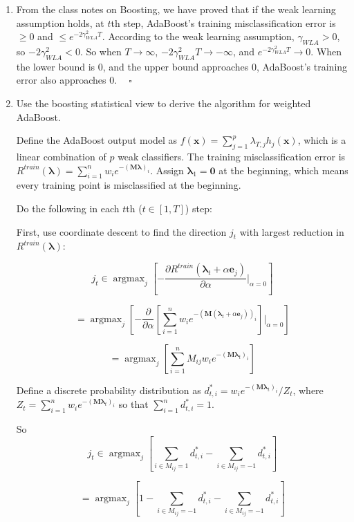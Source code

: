 \documentclass[paper=letter, fontsize=12pt]{article}
\DeclareMathOperator*{\argmax}{argmax}
\begin{document}
\begin{enumerate}[label=(\alph*)]
	
	\item From the class notes on Boosting, we have proved that if the weak learning assumption holds, at $t$th step, AdaBoost's training misclassification error is $\geq 0$ and $ \leq e^{-2 \gamma^2_{WLA}T}$. According to the weak learning assumption, $\gamma_{WLA} > 0$, so $-2 \gamma^2_{WLA} < 0$. So when $T \rightarrow \infty$, $-2 \gamma^2_{WLA} T \rightarrow -\infty$, and $e^{-2 \gamma^2_{WLA}T} \rightarrow 0$. When the lower bound is 0, and the upper bound approaches 0, AdaBoost's training error also approaches 0. $\ \ \ \ \square$
	
	\item Use the boosting statistical view to derive the algorithm for weighted AdaBoost.
	
	Define the AdaBoost output model as $f(\mathbf{x}) = \sum_{j = 1}^{p} \lambda_{T, j} h_j(\mathbf{x})$, which is a linear combination of $p$ weak classifiers. The training misclassification error is $R^{train}(\mathbf{\lambda}) = \sum_{i = 1}^{n} w_i e^{-(\mathbf{M} \mathbf{\lambda})_i}$. Assign $\mathbf{\lambda}_1 = \mathbf{0}$ at the beginning, which means every training point is misclassified at the beginning.
	
	Do the following in each $t$th ($t \in [1, T]$) step:
	
	First, use coordinate descent to find the direction $j_t$ with largest reduction in $R^{train}(\mathbf{\lambda})$:
	
	$$j_t \in \argmax_j [- \frac{\partial R^{train}(\mathbf{\lambda}_t + \alpha \mathbf{e}_j)}{\partial \alpha} |_{\alpha = 0}]$$
	
	$$= \argmax_j [- \frac{\partial}{\partial \alpha} [\sum_{i = 1}^{n} w_i e^{-(\mathbf{M}(\mathbf{\lambda}_t + \alpha \mathbf{e}_j))_i}] |_{\alpha = 0}]$$
	
	$$= \argmax_j [\sum_{i = 1}^{n} M_{ij} w_i e^{-(\mathbf{M} \mathbf{\lambda}_t)_i}]$$
	
	Define a discrete probability distribution as $d^*_{t, i} = w_i e^{-(\mathbf{M} \mathbf{\lambda}_t)_i} / Z_t$, where $Z_t = \sum_{i = 1}^{n} w_i e^{-(\mathbf{M} \mathbf{\lambda}_t)_i}$ so that $\sum_{i = 1}^{n} d^*_{t, i} = 1$. 
	
	So $$j_t \in \argmax_j [\sum_{i \in M_{ij} = 1} d^*_{t, i} - \sum_{i \in M_{ij} = -1} d^*_{t, i}] $$
	
	$$= \argmax_j[1 - \sum_{i \in M_{ij} = -1} d^*_{t, i} - \sum_{i \in M_{ij} = -1} d^*_{t, i}]$$
	

\end{enumerate}
\end{document}
